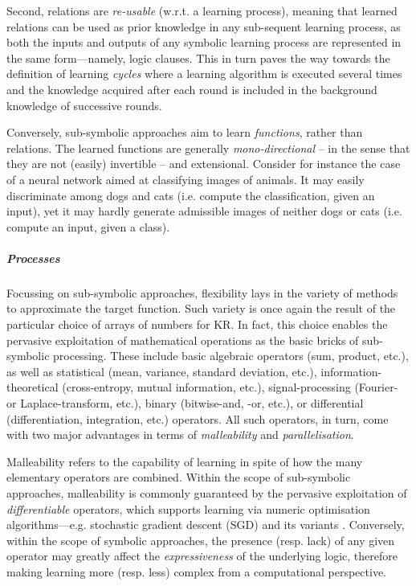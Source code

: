 \documentclass[12pt,a4paper,openright,twoside]{book}
\begin{document}
Second, relations are \emph{re-usable} (w.r.t. a learning process), meaning that learned relations can be used as prior knowledge in any sub-sequent learning process, as both the inputs and outputs of any symbolic learning process are represented in the same form---namely, logic clauses.
%
This in turn paves the way towards the definition of learning \emph{cycles} where a learning algorithm is executed several times and the knowledge acquired after each round is included in the background knowledge of successive rounds.

Conversely, sub-symbolic approaches aim to learn \emph{functions}, rather than relations.
%
The learned functions are generally \emph{mono-directional} -- in the sense that they are not (easily) invertible -- and extensional.
%
Consider for instance the case of a neural network aimed at classifying images of animals.
%
It may easily discriminate among dogs and cats (i.e. compute the classification, given an input), yet it may hardly generate admissible images of neither dogs or cats (i.e. compute an input, given a class)\footnotemark.


\subparagraph{Processes}

Focussing on sub-symbolic approaches, flexibility lays in the variety of methods to approximate the target function.
%
Such variety is once again the result of the particular choice of arrays of numbers for KR.
%
In fact, this choice enables the pervasive exploitation of mathematical operations as the basic bricks of sub-symbolic processing. %
%
These include basic algebraic operators (sum, product, etc.), as well as statistical (mean, variance, standard deviation, etc.), information-theoretical (cross-entropy, mutual information, etc.), signal-processing (Fourier- or Laplace-transform, etc.), binary (bitwise-and, -or, etc.), or differential (differentiation, integration, etc.) operators.
%
All such operators, in turn, come with two major advantages in terms of \emph{malleability} and \emph{parallelisation}.

Malleability refers to the capability of learning in spite of how the many elementary operators are combined.
%
Within the scope of sub-symbolic approaches, malleability is commonly guaranteed by the pervasive exploitation of \emph{differentiable} operators, which supports learning via numeric optimisation algorithms---e.g. stochastic gradient descent (SGD) and its variants \cite{enwiki:SGD}.
%
Conversely, within the scope of symbolic approaches, the presence (resp. lack) of any given operator may greatly affect the \emph{expressiveness} of the underlying logic, therefore making learning more (resp. less) complex from a computational perspective.
\end{document}
